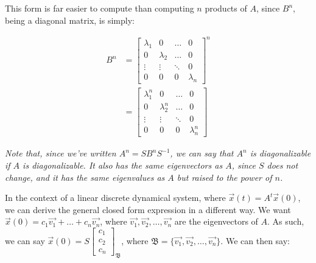 \documentclass[12pt]{article}
\begin{document}
{{This form is far easier to compute than computing $n$ products of $A$, since $B^n$, being a diagonal matrix, is simply:

\begin{align*}
    B^n &= \begin{bmatrix}
        \lambda_1 & 0 & \dots & 0\\
        0 & \lambda_2 & \dots & 0\\
        \vdots & \vdots & \ddots & 0 \\
        0 & 0 & 0 & \lambda_n
    \end{bmatrix}^n\\
    &= \begin{bmatrix}
        \lambda_1^n & 0 & \dots & 0\\
        0 & \lambda_2^n & \dots & 0\\
        \vdots & \vdots & \ddots & 0 \\
        0 & 0 & 0 & \lambda_n^n
    \end{bmatrix}
\end{align*}

\textit{Note that, since we've written $A^n = SB^nS^{-1}$, we can say that $A^n$ is diagonalizable if $A$ is diagonalizable. It also has the same eigenvectors as $A$, since $S$ does not change, and it has the same eigenvalues as $A$ but raised to the power of $n$.}

In the context of a linear discrete dynamical system, where $\vec{x}(t) = A^t\vec{x}(0)$, we can derive the general closed form expression in a different way. We want $\vec{x}(0) = c_1\vec{v_1} + \dots + c_n\vec{v_n}$, where $\vec{v_1}, \vec{v_2}, \dots, \vec{v_n}$ are the eigenvectors of $A$. As such, we can say $\vec{x}(0) = S\begin{bmatrix}
    c_1\\
    c_2\\
    c_n
\end{bmatrix}_{\mathfrak{B}}$, where $\mathfrak{B} = \{\vec{v_1}, \vec{v_2}, \dots, \vec{v_n}\}$. We can then say:

}}
\end{document}
